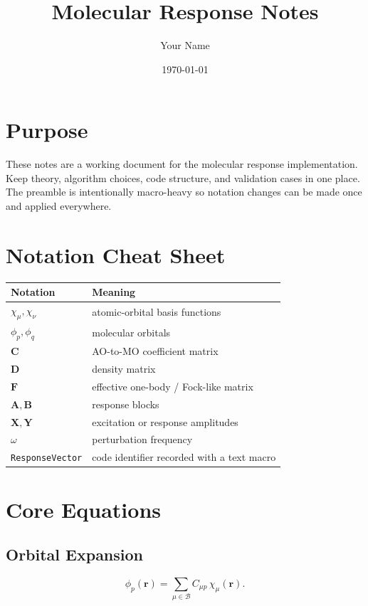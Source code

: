 \documentclass[11pt]{article}
\title{Molecular Response Notes}
\author{Your Name}
\date{\today}
\numberwithin{equation}{section}
\newcommand{\code}[1]{\texttt{#1}}
\newcommand{\class}[1]{\texttt{#1}}
\newcommand{\vect}[1]{\bm{#1}}
\newcommand{\mat}[1]{\bm{#1}}
\newcommand{\ao}[1]{\chi_{#1}}
\newcommand{\mo}[1]{\phi_{#1}}
\newcommand{\basisset}{\mathcal{B}}
\newcommand{\coef}{\mat{C}}
\newcommand{\density}{\mat{D}}
\newcommand{\fock}{\mat{F}}
\newcommand{\Aresp}{\mat{A}}
\newcommand{\Bresp}{\mat{B}}
\newcommand{\Xresp}{\vect{X}}
\newcommand{\Yresp}{\vect{Y}}
\newcommand{\freq}{\omega}
\begin{document}
\maketitle
\tableofcontents

\section{Purpose}

These notes are a working document for the molecular response implementation.
Keep theory, algorithm choices, code structure, and validation cases in one place.
The preamble is intentionally macro-heavy so notation changes can be made once and
applied everywhere.

\section{Notation Cheat Sheet}

\begin{table}[h]
\centering
\begin{tabular}{ll}
\toprule
Notation & Meaning \\
\midrule
$\ao{\mu}, \ao{\nu}$ & atomic-orbital basis functions \\
$\mo{p}, \mo{q}$ & molecular orbitals \\
$\coef$ & AO-to-MO coefficient matrix \\
$\density$ & density matrix \\
$\fock$ & effective one-body / Fock-like matrix \\
$\Aresp, \Bresp$ & response blocks \\
$\Xresp, \Yresp$ & excitation or response amplitudes \\
$\freq$ & perturbation frequency \\
\code{\class{ResponseVector}} & code identifier recorded with a text macro \\
\bottomrule
\end{tabular}
\end{table}

\section{Core Equations}

\subsection{Orbital Expansion}

\begin{equation}
  \mo{p}(\vect{r}) = \sum_{\mu \in \basisset} C_{\mu p}\,\ao{\mu}(\vect{r}).
\end{equation}
\end{document}
